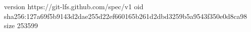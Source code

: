 version https://git-lfs.github.com/spec/v1
oid sha256:127a69f5b9143d2dae255d22ef660165b261d2dbd3259b5a9543f350e0d8ca98
size 253599
